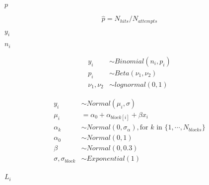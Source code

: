 \documentclass[10pt]{book}
\begin{document}
\begin{mdSnippets}
\begin{mdInlineSnippet}[83878c91171338902e0fe0fb97a8c47a]%
{$p$}\end{mdInlineSnippet}%
\begin{mdDisplaySnippet}[8b23924457e6274a87d329639fcfb54f]%
\[%
\hat {p} = N_{hits}/N_{attempts}
\]%
\end{mdDisplaySnippet}%
\begin{mdInlineSnippet}[8d62e469fb30ed435a668eb5c035b1f6]%
{$y_i$}\end{mdInlineSnippet}%
\begin{mdInlineSnippet}[584a81dbf5bf6aa737ba43567ad6307b]%
{$n_i$}\end{mdInlineSnippet}%
\begin{mdDisplaySnippet}%
\[%
\begin{aligned}
y_i &\sim Binomial(n_i, p_i) \\
p_i &\sim Beta(\nu_1, \nu_2) \\
\nu_1, \nu_2 &\sim lognormal(0, 1)
\end{aligned}
\]%
\end{mdDisplaySnippet}%
\begin{mdDisplaySnippet}[f897d61b7969e43a53cd11176b5dcd2e]%
\[%
\begin{aligned}
y_i &\sim Normal(\mu_i, \sigma) \\ 
\mu_i &= \alpha_0 + \alpha_{block[i]} + \beta x_i \\ 
\alpha_k &\sim Normal(0, \sigma_{\alpha}), \text{for $k$ in } \{1,\cdots ,N_{blocks}\} \\ 
\alpha_0 &\sim Normal(0, 1) \\
\beta &\sim Normal(0, 0.3) \\
\sigma, \sigma_{block} &\sim Exponential(1) \\
\end{aligned}
\]%
\end{mdDisplaySnippet}%
\begin{mdInlineSnippet}%
{$L_i$}\end{mdInlineSnippet}%
\begin{mdDisplaySnippet}%

\end{mdDisplaySnippet}
\end{mdSnippets}
\end{document}
